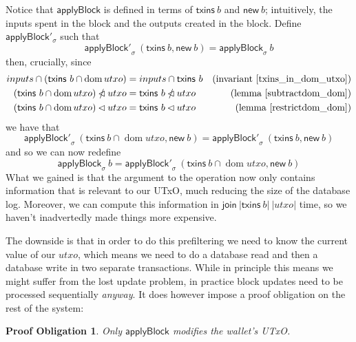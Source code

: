 \documentclass{article}
\DeclareMathOperator{\dom}{dom}
\newcommand{\restrictdom}{\lhd}
\newcommand{\subtractdom}{\mathbin{\slashed{\restrictdom}}}
\newtheorem{proofobligation}{Proof Obligation}
\begin{document}
Notice that $\mathsf{applyBlock}$ is defined in terms of $\mathsf{txins} ~
b$ and $\mathsf{new} ~ b$; intuitively, the inputs spent in the block and the
outputs created in the block. Define $\mathsf{applyBlock}'_\sigma$ such that
%
\begin{equation*}
  \mathsf{applyBlock'}_\sigma ~ (\mathsf{txins} ~ b, \mathsf{new} ~ b)
= \mathsf{applyBlock}_\sigma ~ b
\end{equation*}
%
then, crucially, since
%
\begin{align*}
inputs \cap (\mathsf{txins} ~ b \cap \dom utxo) & = inputs \cap \mathsf{txins} ~ b & \text{(invariant~\ref{txins_in_dom_utxo})} \\
(\mathsf{txins} ~ b \cap \dom utxo) \subtractdom utxo & = \mathsf{txins} ~ b \subtractdom utxo & \text{(lemma~\ref{subtractdom_dom})} \\
(\mathsf{txins} ~ b \cap \dom utxo) \restrictdom utxo & = \mathsf{txins} ~ b \restrictdom utxo & \text{(lemma~\ref{restrictdom_dom})} \\
\end{align*}
%
we have that
%
\begin{equation*}
  \mathsf{applyBlock'}_\sigma ~ (\mathsf{txins} ~ b \cap \dom utxo, \mathsf{new} ~ b)
= \mathsf{applyBlock'}_\sigma ~ (\mathsf{txins} ~ b, \mathsf{new} ~ b)
\end{equation*}
%
and so we can now redefine
%
\begin{equation*}
  \mathsf{applyBlock}_\sigma ~ b
= \mathsf{applyBlock'}_\sigma ~ (\mathsf{txins} ~ b \cap \dom utxo, \mathsf{new} ~ b)
\end{equation*}
%
What we gained is that the argument to the operation now only contains
information that is relevant to our UTxO, much reducing the size of the database
log. Moreover, we can compute this information in
\begin{math}
\mathsf{join} ~ |\mathsf{txins} ~ b| ~ |utxo|
\end{math}
time, so we haven't inadvertedly made things more expensive.

The downside is that in order to do this prefiltering we need to know the
current value of our $utxo$, which means we need to do a database read and then
a database write in two separate transactions. While in principle this means
we might suffer from the lost update problem, in practice block updates need to
be processed sequentially \emph{anyway}. It does however impose a proof
obligation on the rest of the system:

\begin{proofobligation}
Only $\mathsf{applyBlock}$ modifies the wallet's UTxO.
\end{proofobligation}
\end{document}
